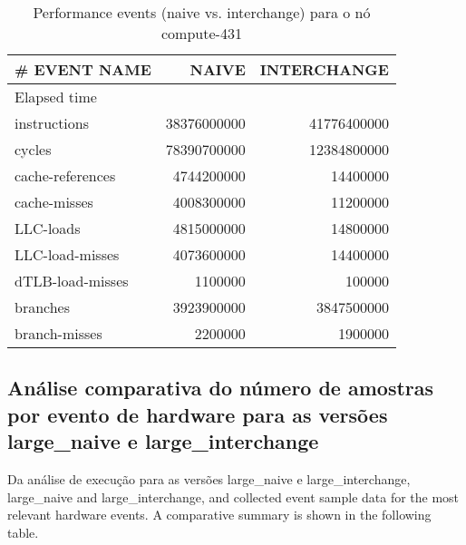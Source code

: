 \documentclass[conference,compsoc]{IEEEtran}
\begin{document}
 \begin{table}[H]
  \caption{Performance events (naive vs. interchange) para o nó compute-431}
  \label{table:search_events}
  \centering
  \begin{tabular}{ | l | r | r |   }

  \hline
  \# EVENT NAME	 & NAIVE  & INTERCHANGE \\ \hline 
   Elapsed time & &  \\ \hline    
  instructions	& 38376000000 &  41776400000 \\ \hline    
cycles	& 78390700000 &  12384800000 \\ \hline    
cache-references	& 4744200000 &  14400000 \\ \hline    
cache-misses	&  4008300000 &  11200000 \\ \hline    
LLC-loads	& 4815000000  &  14800000 \\ \hline    
LLC-load-misses	& 4073600000 & 14400000  \\ \hline    
dTLB-load-misses & 1100000	& 100000  \\ \hline    
branches	& 3923900000 & 3847500000  \\ \hline    
branch-misses	&  2200000 &  1900000 \\ \hline    

  \end{tabular}
  \end{table}

\subsection{Análise comparativa do número de amostras por evento de hardware para as versões large\_naive e large\_interchange}

Da análise de execução para as versões large\_naive e large\_interchange, 
 large_naive and large_interchange, and collected event sample data for the most relevant hardware events. A comparative summary is shown in the following table.
\end{document}
